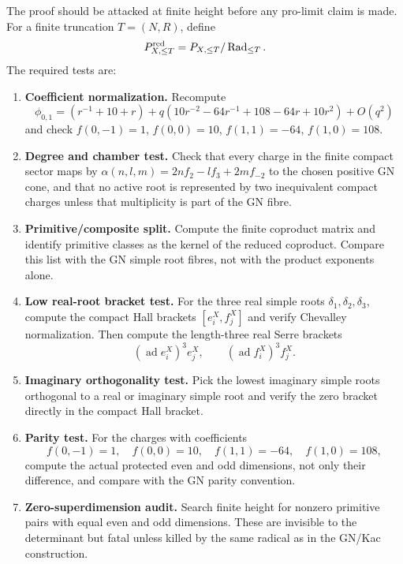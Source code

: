 The proof should be attacked at finite height before any pro-limit
claim is made.  For a finite truncation \(T=(N,R)\), define
\[
P_{X,\le T}^{\mathrm{red}}
=
P_{X,\le T}/\operatorname{Rad}_{\le T}.
\]
The required tests are:

\begin{enumerate}
\item \textbf{Coefficient normalization.}  Recompute
\[
\phi_{0,1}=(r^{-1}+10+r)
+q(10r^{-2}-64r^{-1}+108-64r+10r^2)+O(q^2)
\]
and check \(f(0,-1)=1\), \(f(0,0)=10\), \(f(1,1)=-64\),
\(f(1,0)=108\).

\item \textbf{Degree and chamber test.}  Check that every charge in the
finite compact sector maps by \(\alpha(n,l,m)=2nf_2-lf_3+2mf_{-2}\) to
the chosen positive GN cone, and that no active root is represented by
two inequivalent compact charges unless that multiplicity is part of the
GN fibre.

\item \textbf{Primitive/composite split.}  Compute the finite coproduct
matrix and identify primitive classes as the kernel of the reduced
coproduct.  Compare this list with the GN simple root fibres, not with
the product exponents alone.

\item \textbf{Low real-root bracket test.}  For the three real simple
roots \(\delta_1,\delta_2,\delta_3\), compute the compact Hall brackets
\([e_i^X,f_j^X]\) and verify Chevalley normalization.  Then compute the
length-three real Serre brackets
\[
(\operatorname{ad}e_i^X)^3e_j^X,\qquad
(\operatorname{ad}f_i^X)^3f_j^X.
\]

\item \textbf{Imaginary orthogonality test.}  Pick the lowest imaginary
simple roots orthogonal to a real or imaginary simple root and verify
the zero bracket directly in the compact Hall bracket.

\item \textbf{Parity test.}  For the charges with coefficients
\[
f(0,-1)=1,\quad f(0,0)=10,\quad f(1,1)=-64,\quad f(1,0)=108,
\]
compute the actual protected even and odd dimensions, not only their
difference, and compare with the GN parity convention.

\item \textbf{Zero-superdimension audit.}  Search finite height for
nonzero primitive pairs with equal even and odd dimensions.  These are
invisible to the determinant but fatal unless killed by the same
radical as in the GN/Kac construction.


\end{enumerate}
